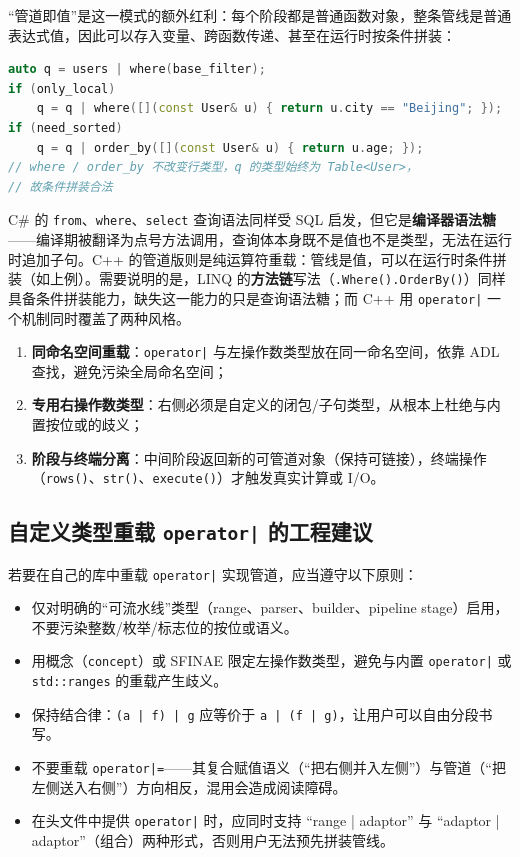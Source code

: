\documentclass[12pt,a4paper,fontset=fandol]{ctexbook}
\newcommand{\cpp}[1]{C++#1}
\newcommand{\Fn}[1]{\texttt{#1()}}
\newcommand{\Tp}[1]{\texttt{#1}}
\newcommand{\csharp}{C\#}
\newcommand{\Op}[1]{\texttt{operator#1}}
\begin{document}
``管道即值''是这一模式的额外红利：每个阶段都是普通函数对象，整条管线是普通表达式值，因此可以存入变量、跨函数传递、甚至在运行时按条件拼装：

\begin{lstlisting}[language=C++]
auto q = users | where(base_filter);
if (only_local)
    q = q | where([](const User& u) { return u.city == "Beijing"; });
if (need_sorted)
    q = q | order_by([](const User& u) { return u.age; });
// where / order_by 不改变行类型，q 的类型始终为 Table<User>，
// 故条件拼装合法
\end{lstlisting}

\begin{compare}[title=与 \csharp{} LINQ 查询语法的对照]
\csharp{} 的 \Tp{from}、\Tp{where}、\Tp{select} 查询语法同样受 SQL 启发，但它是\textbf{编译器语法糖}——编译期被翻译为点号方法调用，查询体本身既不是值也不是类型，无法在运行时追加子句。\cpp{} 的管道版则是纯运算符重载：管线是值，可以在运行时条件拼装（如上例）。需要说明的是，LINQ 的\textbf{方法链}写法（\Tp{.Where().OrderBy()}）同样具备条件拼装能力，缺失这一能力的只是查询语法糖；而 \cpp{} 用 \Op{|} 一个机制同时覆盖了两种风格。
\end{compare}

\begin{guideline}[title=自定义左操作数三要素]
\begin{enumerate}
  \item \textbf{同命名空间重载}：\Op{|} 与左操作数类型放在同一命名空间，依靠 ADL 查找，避免污染全局命名空间；
  \item \textbf{专用右操作数类型}：右侧必须是自定义的闭包/子句类型，从根本上杜绝与内置按位或的歧义；
  \item \textbf{阶段与终端分离}：中间阶段返回新的可管道对象（保持可链接），终端操作（\Fn{rows}、\Fn{str}、\Fn{execute}）才触发真实计算或 I/O。
\end{enumerate}
\end{guideline}

\subsection{自定义类型重载 \Op{|} 的工程建议}

\begin{warning}[title=不要随意重载 \Op{|}]
若要在自己的库中重载 \Op{|} 实现管道，应当遵守以下原则：
\begin{itemize}
  \item 仅对明确的``可流水线''类型（range、parser、builder、pipeline stage）启用，不要污染整数/枚举/标志位的按位或语义。
  \item 用概念（\Tp{concept}）或 SFINAE 限定左操作数类型，避免与内置 \Op{|} 或 \Tp{std::ranges} 的重载产生歧义。
  \item 保持结合律：\Tp{(a | f) | g} 应等价于 \Tp{a | (f | g)}，让用户可以自由分段书写。
  \item 不要重载 \Op{|=}——其复合赋值语义（``把右侧并入左侧''）与管道（``把左侧送入右侧''）方向相反，混用会造成阅读障碍。
  \item 在头文件中提供 \Tp{operator|} 时，应同时支持 ``range | adaptor'' 与 ``adaptor | adaptor''（组合）两种形式，否则用户无法预先拼装管线。
\end{itemize}
\end{warning}
\end{document}
